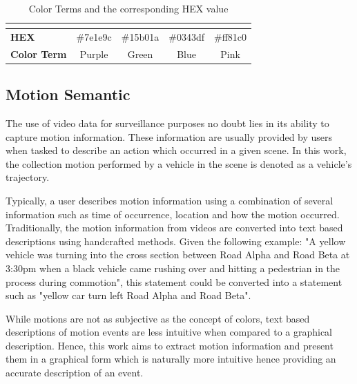 \begin{table}[]
\begin{tabular}{lcccc}
\multicolumn{1}{l|}{}                     & \multicolumn{1}{l|}{\cellcolor[HTML]{7E1E9C}} & \multicolumn{1}{l|}{\cellcolor[HTML]{15B01A}} & \multicolumn{1}{l|}{\cellcolor[HTML]{0343DF}} & \multicolumn{1}{l|}{\cellcolor[HTML]{FF81C0}} \\ \hline
\multicolumn{1}{|l|}{\textbf{HEX}}        & \multicolumn{1}{c|}{\#7e1e9c}                 & \multicolumn{1}{c|}{\#15b01a}                 & \multicolumn{1}{c|}{\#0343df}                 & \multicolumn{1}{c|}{\#ff81c0}                 \\ \hline
\multicolumn{1}{|l|}{\textbf{Color Term}}  & \multicolumn{1}{c|}{Purple}                   & \multicolumn{1}{c|}{Green}                    & \multicolumn{1}{c|}{Blue}                     & \multicolumn{1}{c|}{Pink}                     \\ \hline
\end{tabular}
\caption{Color Terms and the corresponding HEX value}
\label{table:colorshex}
\end{table}



\subsection{Motion Semantic}

The use of video data for surveillance purposes no doubt lies in its ability to capture motion information. These information are usually provided by users when tasked to describe an action which occurred in a given scene. In this work, the collection motion performed by a vehicle in the scene is denoted as a vehicle's trajectory.  

Typically, a user describes motion information using a combination of several information such as time of occurrence, location and how the motion occurred. Traditionally, the motion information from videos are converted into text based descriptions using handcrafted methods. Given the following example: "A yellow vehicle was turning into the cross section between Road Alpha and Road Beta at 3:30pm when a black vehicle came rushing over and hitting a pedestrian in the process during commotion", this statement could be converted into a statement such as "yellow car turn left Road Alpha and Road Beta". 

While motions are not as subjective as the concept of colors, text based descriptions of motion events are less intuitive when compared to a graphical description. Hence, this work aims to extract motion information and present them in a graphical form which is naturally more intuitive hence providing an accurate description of an event.



